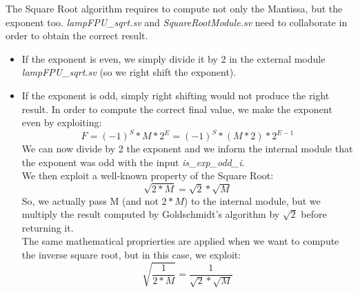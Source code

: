 The Square Root algorithm requires to compute not only the Mantissa, but the exponent too. \emph{lampFPU\_sqrt.sv} and  \emph{SquareRootModule.sv} need to collaborate in order to obtain the correct result. 
\begin{itemize}
\item If the exponent is even, we simply divide it by 2 in the external module \emph{lampFPU\_sqrt.sv}  (so we right shift the exponent).
\item If the exponent is odd, simply right shifting would not produce the right result. In order to compute the correct final value, we make the exponent even by exploiting:
$$F = (-1)^{S}*M*2^{E}  = (-1)^{S}*(M*2)*2^{E-1} $$
We can now divide by 2 the exponent and we inform the internal module that the exponent was odd with the input \emph{is\_exp\_odd\_i}. \\
We then exploit a well-known property of the Square Root:
$$ \sqrt{2*M} = \sqrt{2} * \sqrt{M} $$
So, we actually pass M (and not $2 * M$) to the internal module, but we multiply the result computed by Goldschmidt's algorithm by $\sqrt{2}$ before returning it.\\
The same mathematical proprierties are applied when we want to compute the inverse square root, but in this case, we exploit:
$$ \sqrt{\frac{1}{2*M}} = \frac{1}{\sqrt{2} * \sqrt{M}} $$
\end{itemize} 

